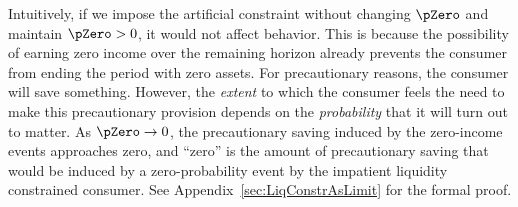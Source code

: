 \documentclass[\econtexRoot/BufferStockTheory]{subfiles}
\begin{document}
Intuitively, if we impose the artificial constraint without changing $\pZero$ and maintain $\pZero>0$, it would not affect behavior.
This is because the possibility of earning zero income over the remaining horizon already prevents the consumer from ending the period with zero assets.
For precautionary reasons, the consumer will save something.
However, the \textit{extent} to which the consumer feels the need to make this precautionary provision depends on the \textit{probability} that it will turn out to matter.
As  $\pZero \rightarrow 0$, the   precautionary saving induced by the zero-income events approaches zero, and ``zero'' is the amount of precautionary saving that would be induced by a zero-probability event by the impatient liquidity constrained consumer.
See Appendix~\ref{sec:LiqConstrAsLimit} for the formal proof.

\end{document}
